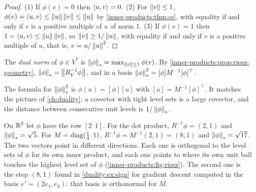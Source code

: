 \begin{notechapter}
\begin{proof}
(1) If $\phi(v) = 0$ then $\left\langle u, v \right\rangle = 0$. (2) For $\left\|v\right\|\leq1$,
$\phi(v) = \left\langle u, v \right\rangle\leq\left\|u\right\|\left\|v\right\|\leq\left\|u\right\|$ by
\cref{inner-products:thm:cs}, with equality if and only if $v$ is a
positive multiple of $u$ of norm $1$. (3) If $\phi(v) = 1$ then
$1 = \left\langle u, v \right\rangle\leq\left\|u\right\|\left\|v\right\|$, so $\left\|v\right\|\geq1/\left\|u\right\|$, with equality
if and only if $v$ is a positive multiple of $u$, that is,
$v = u/\left\|u\right\|^2$.
\end{proof}

\begin{definition}\label{inner-products:def:dual-norm}
The \emph{dual norm} of $\phi\in V^*$ is
$\left\|\phi\right\|_* = \max_{\left\|v\right\|\leq1}\phi(v)$. By
\cref{inner-products:prop:riesz-geometry},
$\left\|\phi\right\|_* = \left\|R_V^{-1}\phi\right\|$, and in a basis
$\left\|\phi\right\|_*^2 = [\phi]M^{-1}[\phi]^\top$.
\end{definition}

The formula for $\left\|\phi\right\|_*^2$ is $\phi(u) = [\phi][u]$ with
$[u] = M^{-1}[\phi]^\top$. It matches the picture of \cref{ch:duality}: a
covector with tight level sets is a large covector, and the distance
between consecutive unit levels is $1/\left\|\phi\right\|_*$.

\begin{example}
\label{inner-products:ex:two-reps}
On $\mathbb{R}^2$ let $\phi$ have the row $[2\ \ 1]$. For the dot product,
$R^{-1}\phi = (2, 1)$ and $\left\|\phi\right\|_* = \sqrt5$. For
$M = \operatorname{diag}(\frac14, 1)$, $R^{-1}\phi = M^{-1}(2, 1) = (8, 1)$ and
$\left\|\phi\right\|_* = \sqrt{17}$. The two vectors point in different directions.
Each one is orthogonal to the level sets of $\phi$ for its own inner
product, and each one points to where its own unit ball touches the
highest level set of $\phi$ (\cref{inner-products:fig:riesz}). The second
one is the step $(8, 1)$ found in \cref{duality:ex:sign} for gradient
descent computed in the basis $e' = (2e_1, e_2)$: that basis is
orthonormal for $M$.
\end{example}


\end{notechapter}
